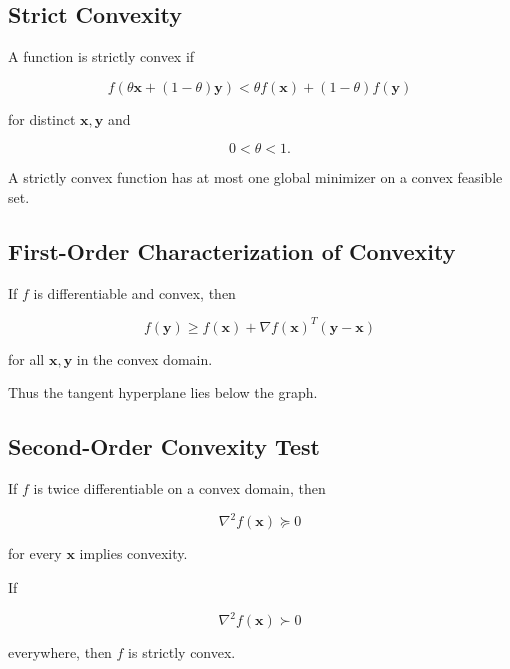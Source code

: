 \subsection{Strict Convexity}
\label{subsec:strict-convexity}

A function is strictly convex if

\[
\boxed{
f
(
\theta\mathbf{x}
+
(1-\theta)\mathbf{y}
)
<
\theta f(\mathbf{x})
+
(1-\theta)f(\mathbf{y})
}
\]

for distinct \(\mathbf{x},\mathbf{y}\) and

\[
0<\theta<1.
\]

A strictly convex function has at most one global minimizer on a convex
feasible set.

\subsection{First-Order Characterization of Convexity}
\label{subsec:first-order-convexity}

If \(f\) is differentiable and convex, then

\[
\boxed{
f(\mathbf{y})
\geq
f(\mathbf{x})
+
\nabla f(\mathbf{x})^T
(
\mathbf{y}-\mathbf{x}
)
}
\]

for all \(\mathbf{x},\mathbf{y}\) in the convex domain.

Thus the tangent hyperplane lies below the graph.

\subsection{Second-Order Convexity Test}
\label{subsec:second-order-convexity}

If \(f\) is twice differentiable on a convex domain, then

\[
\boxed{
\nabla^2f(\mathbf{x})
\succeq0
}
\]

for every \(\mathbf{x}\) implies convexity.

If

\[
\boxed{
\nabla^2f(\mathbf{x})
\succ0
}
\]

everywhere, then \(f\) is strictly convex.

